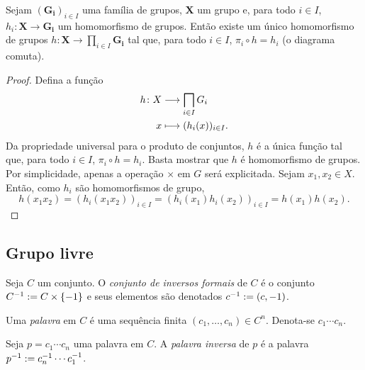 \begin{proposition}
Sejam $(\bm{G_i})_{i \in I}$ uma família de grupos, $\bm X$ um grupo e, para todo $i \in I$, $h_i: \bm X \to \bm{G_i}$ um homomorfismo de grupos. Então existe um único homomorfismo de grupos $h: \bm X \to \prod_{i \in I} \bm{G_i}$ tal que, para todo $i \in I$, $\pi_i \circ h = h_i$ (o diagrama comuta).
\begin{figure}
\centering
{}
\end{figure}
\end{proposition}
\begin{proof}
Defina a função
	\begin{align*}
	\func{h}{X}{\prod_{i \in I} G_i}{x}{(h_i(x))_{i \in I}}.
	\end{align*}
Da propriedade universal para o produto de conjuntos, $h$ é a única função tal que, para todo $i \in I$, $\pi_i \circ h = h_i$. Basta mostrar que $h$ é homomorfismo de grupos. Por simplicidade, apenas a operação $\times$ em $G$ será explicitada. Sejam $x_1,x_2 \in X$. Então, como $h_i$ são homomorfismos de grupo,
	\begin{equation*}
	h(x_1x_2) = (h_i(x_1x_2))_{i \in I} = (h_i(x_1)h_i(x_2))_{i \in I} = h(x_1)h(x_2).
	\end{equation*}
\end{proof}

\subsection{Grupo livre}

\begin{definition}
Seja $C$ um conjunto. O \emph{conjunto de inversos formais} de $C$ é o conjunto $C^{-1} := C \times \{-1\}$ e seus elementos são denotados $c^{-1} := (c,-1)$.

Uma \emph{palavra} em $C$ é uma sequência finita $(c_1,\ldots,c_n) \in C^n$. Denota-se $c_1 \cdots c_n$.
\end{definition}

Seja $p=c_1 \cdots c_n$ uma palavra em $C$. A \emph{palavra inversa} de $p$ é a palavra $p^{-1} := c_n^{-1} \cdots c_1^{-1}$.

